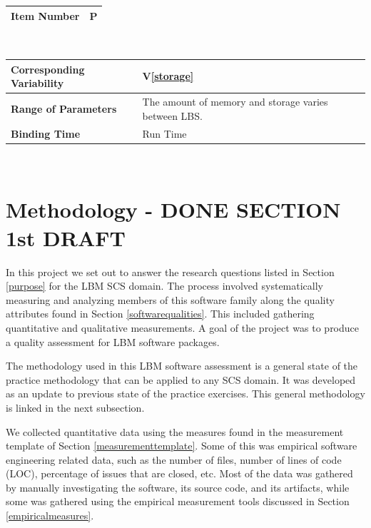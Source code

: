 \documentclass[12pt, notitlepage]{article}
\newcommand{\colEwidth}{0.33\textwidth}
\newcommand{\colFwidth}{0.67\textwidth}
\newcommand{\vref}[1]{V\ref{#1}}
\newcounter{parnum} %
\begin{document}
\begin{minipage}{\textwidth}
	\renewcommand*{\arraystretch}{1.5}
	\begin{tabular}{| p{\colEwidth} | p{\colFwidth}|}
		\hline
		\bf Item Number& P{parnum}\theparnum\label{parstorageconst} \\
		\hline
	\end{tabular}\\
	
	\begin{tabular}{| p{\colEwidth} | p{\colFwidth}|}		
		\hline
		\bf Corresponding Variability & \vref{storage}\\
		\hline
		\bf Range of Parameters & The amount of memory and storage varies between LBS.\\
		\hline
		\bf Binding Time & Run Time\\
		\hline
	\end{tabular}
\end{minipage}\\

\newpage
\section{Methodology - DONE SECTION 1st DRAFT}

In this project we set out to answer the research questions listed in Section \ref{purpose} for the LBM SCS domain. The process involved systematically measuring and analyzing members of this software family along the quality attributes found in Section \ref{softwarequalities}. This included gathering quantitative and qualitative measurements. A goal of the project was to produce a quality assessment for LBM software packages.  

The methodology used in this LBM software assessment is a general state of the practice methodology that can be applied to any SCS domain. It was developed as an update to previous state of the practice exercises. This general methodology is linked in the next subsection.

We collected quantitative data using the measures found in the measurement template of Section \ref{measurementtemplate}. Some of this was empirical software engineering related data, such as the number of files, number of lines of code (LOC), percentage of issues that are closed, etc. Most of the data was gathered by manually investigating the software, its source code, and its artifacts, while some was gathered using the empirical measurement tools discussed in Section \ref{empiricalmeasures}.
\end{document}

